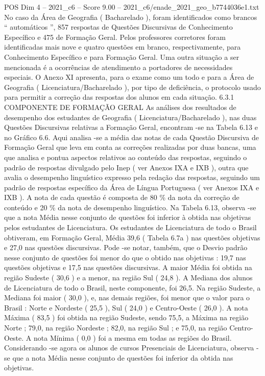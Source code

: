 \begin{textsample}{POS Dim 4 – 2021\_c6 – Score 9.00 – 2021\_c6/enade\_2021\_geo\_b7744036e1.txt}
No caso da Área de Geografia ( Bacharelado ), foram identificados como brancos “ automáticos ”, 857 respostas de Questões Discursivas de Conhecimento Específico e 475 de Formação Geral.
Pelos professores corretores foram identificadas mais nove e quatro questões em branco, respectivamente, para Conhecimento Específico e para Formação Geral.
Uma outra situação a ser mencionada é a ocorrências de atendimento a portadores de necessidades especiais.
O Anexo XI apresenta, para o exame como um todo e para a Área de Geografia ( Licenciatura/Bacharelado ), por tipo de deficiência, o protocolo usado para permitir a correção das respostas dos alunos em cada situação. 6.3.1 COMPONENTE DE FORMAÇÃO GERAL As análises dos resultados de desempenho dos estudantes de Geografia ( Licenciatura/Bacharelado ), nas duas Questões Discursivas relativas a Formação Geral, encontram -se na Tabela 6.13 e no Gráfico 6.6.
Aqui analisa -se a média das notas de cada Questão Discursiva de Formação Geral que leva em conta as correções realizadas por duas bancas, uma que analisa e pontua aspectos relativos ao conteúdo das respostas, seguindo o padrão de respostas divulgado pelo Inep ( ver Anexos IXA e IXB ), outra que avalia o desempenho linguístico expresso pela redação das respostas, seguindo um padrão de respostas específico da Área de Língua Portuguesa ( ver Anexos IXA e IXB ).
A nota de cada questão é composta de 80 \% da nota da correção de conteúdo e 20 \% da nota de desempenho linguístico.
Na Tabela 6.13, observa -se que a nota Média nesse conjunto de questões foi inferior à obtida nas objetivas pelos estudantes de Licenciatura.
Os estudantes de Licenciatura de todo o Brasil obtiveram, em Formação Geral, Média 39,6 ( Tabela 6.7a ) nas questões objetivas e 27,0 nas questões discursivas.
Pode -se notar, também, que o Desvio padrão nesse conjunto de questões foi menor do que o obtido nas objetivas : 19,7 nas questões objetivas e 17,5 nas questões discursivas.
A maior Média foi obtida na região Sudeste ( 30,6 ) e a menor, na região Sul ( 24,8 ).
A Mediana dos alunos de Licenciatura de todo o Brasil, neste componente, foi 26,5.
Na região Sudeste, a Mediana foi maior ( 30,0 ), e, nas demais regiões, foi menor que o valor para o Brasil : Norte e Nordeste ( 25,5 ), Sul ( 24,0 ) e Centro-Oeste ( 26,0 ).
A nota Máxima ( 83,5 ) foi obtida na região Sudeste, sendo 75,5, a Máxima na região Norte ; 79,0, na região Nordeste ; 82,0, na região Sul ; e 75,0, na região Centro-Oeste.
A nota Mínima ( 0,0 ) foi a mesma em todas as regiões do Brasil.
Considerando -se agora os alunos de cursos Presenciais de Licenciatura, observa -se que a nota Média nesse conjunto de questões foi inferior da obtida nas objetivas.

\end{textsample}
